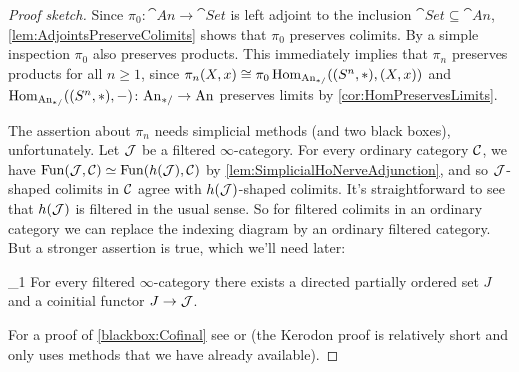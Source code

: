 \begin{proof}[Proof sketch]
	Since $\pi_0\colon\cat{An}\rightarrow\cat{Set}$ is left adjoint to the inclusion $\cat{Set}\subseteq \cat{An}$, \cref{lem:AdjointsPreserveColimits} shows that $\pi_0$ preserves colimits. By a simple inspection $\pi_0$ also preserves products. This immediately implies that $\pi_n$ preserves products for all $n\geqslant 1$, since $\pi_n(X,x)\cong \pi_0\operatorname{Hom}_{\mathrm{An}_{*/}}((S^n,*),(X,x))$ and $\operatorname{Hom}_{\mathrm{An}_{*/}}((S^n,*),-)\colon \mathrm{An}_{*/}\rightarrow \mathrm{An}$ preserves limits by \cref{cor:HomPreservesLimits}.
	
	The assertion about $\pi_n$ needs simplicial methods (and two black boxes), unfortunately. Let $\mathcal{J}$ be a filtered $\infty$-category. For every ordinary category $\mathcal{C}$, we have $\operatorname{Fun}(\mathcal{J},\mathcal{C})\simeq \operatorname{Fun}(h(\mathcal{J}),\mathcal{C})$ by \cref{lem:SimplicialHoNerveAdjunction}, and so $\mathcal{J}$-shaped colimits in $\mathcal{C}$ agree with $h(\mathcal{J})$-shaped colimits. It's straightforward to see that $h(\mathcal{J})$ is filtered in the usual sense. So for filtered colimits in an ordinary category we can replace the indexing diagram by an ordinary filtered category. But a stronger assertion is true, which we'll need later:
	\begin{alphanumerate}\itshape
		\item[\blacksquare_1] For every filtered $\infty$-category there exists a directed partially ordered set $J$ and a coinitial functor $J\rightarrow \mathcal{J}$.\label{blackbox:Cofinal}
	\end{alphanumerate}
	For a proof of \cref{blackbox:Cofinal} see \cite[Proposition~]{HTT} or \cite[Tag~\href{https://kerodon.net/tag/02QA}{02QA}]{Kerodon} (the Kerodon proof is relatively short and only uses methods that we have already available).
	

\end{proof}
